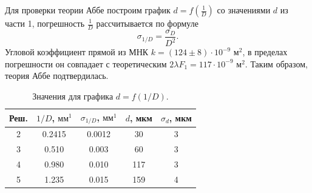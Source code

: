 \documentclass[a4paper,12pt]{article} %
\begin{document}
Для проверки теории Аббе построим график $d = f(\frac{1}{D})$ со значениями $d$ из части 1, погрешность $\frac{1}{D}$ рассчитывается по формуле
$$
\sigma_{1/D} = \dfrac{\sigma_D}{D^2}.
$$
Угловой коэффициент прямой из МНК $k = (124 \pm 8) \cdot 10^{-9} \text{ м}^2$, в пределах погрешности он совпадает с теоретическим $2\lambda F_1 = 117 \cdot 10^{-9} \text{ м}^2$. Таким образом, теория Аббе подтвердилась.
\begin{table}[h]
\begin{tabular}{|c|c|c|c|c|}
\hline
Реш. & $1/D$, $\text{мм}^1$ & $\sigma_{1/D}$, $\text{мм}^1$ & $d$, мкм & $\sigma_d$, мкм \\ \hline
2    & 0.2415               & 0.0012                        & 30       & 3               \\ \hline
3    & 0.510                & 0.003                         & 60       & 3               \\ \hline
4    & 0.980                & 0.010                         & 117      & 3               \\ \hline
5    & 1.235                & 0.015                         & 159      & 4               \\ \hline
\end{tabular}
\centering
\caption{Значения для графика $d = f(1/D)$.}
\end{table}
\newpage
\end{document}
